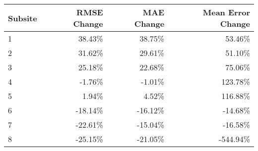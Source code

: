 \begin{tabular}{lrrr}
\toprule
Subsite &  RMSE Change & MAE Change & Mean Error Change \\
\midrule
1 & 38.43\% & 38.75\% & 53.46\% \\
2 & 31.62\% & 29.61\% & 51.10\% \\
3 & 25.18\% & 22.68\% & 75.06\% \\
4 & -1.76\% & -1.01\% & 123.78\% \\
5 & 1.94\% & 4.52\% & 116.88\% \\
6 & -18.14\% & -16.12\% & -14.68\% \\
7 & -22.61\% & -15.04\% & -16.58\% \\
8 & -25.15\% & -21.05\% & -544.94\% \\
\bottomrule
\end{tabular}
